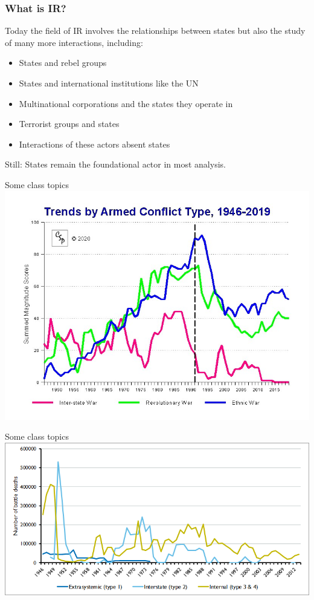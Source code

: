 \documentclass{beamer}
\begin{document}
\begin{frame}
\frametitle{\LARGE{What is IR?}}

Today the field of IR involves the relationships between states but also the study of many more interactions, including:
\begin{itemize}
	\item States and rebel groups \pause
	\item States and international institutions like the UN \pause
	\item Multinational corporations and the states they operate in \pause
	\item Terrorist groups and states \pause
	\item Interactions of these actors absent states \pause
\end{itemize}
Still: States remain the foundational actor in most analysis.
\end{frame}

\begin{frame}{\LARGE Some class topics} %
\centering
\includegraphics[width=\textwidth,height=0.9\textheight,keepaspectratio]{wartyp19.jpg}
\end{frame}

\begin{frame}{\LARGE Some class topics} %
	\centering
	\includegraphics[width=\textwidth]{battledeathnumbers.png}
\end{frame}
\end{document}
